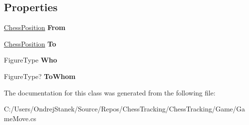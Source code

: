 \subsection*{Properties}
\begin{DoxyCompactItemize}
\item 
\mbox{\label{class_chess_tracking_1_1_game_1_1_game_move_afc7d2066b2d566bfdb8d6589564902b5}} 
\mbox{\hyperlink{class_chess_tracking_1_1_game_1_1_chess_position}{Chess\+Position}} {\bfseries From}
\item 
\mbox{\label{class_chess_tracking_1_1_game_1_1_game_move_a72a58456b4e82214a83790ee1fe8c5d3}} 
\mbox{\hyperlink{class_chess_tracking_1_1_game_1_1_chess_position}{Chess\+Position}} {\bfseries To}
\item 
\mbox{\label{class_chess_tracking_1_1_game_1_1_game_move_af0f8245feca3abde352fba5b371a3c7a}} 
Figure\+Type {\bfseries Who}
\item 
\mbox{\label{class_chess_tracking_1_1_game_1_1_game_move_a017619f7715d46e1278bcda10af4afd6}} 
Figure\+Type? {\bfseries To\+Whom}
\end{DoxyCompactItemize}


The documentation for this class was generated from the following file\+:\begin{DoxyCompactItemize}
\item 
C\+:/\+Users/\+Ondrej\+Stanek/\+Source/\+Repos/\+Chess\+Tracking/\+Chess\+Tracking/\+Game/Game\+Move.\+cs\end{DoxyCompactItemize}
